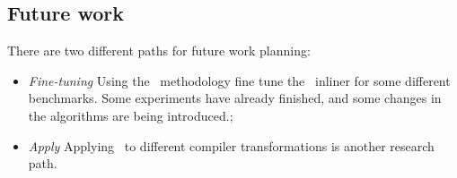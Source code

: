 \subsection{Future work}

There are two different paths for future work planning:
\begin{itemize}
\item {\it Fine-tuning} Using the \CP\ methodology fine tune the \FDI\ inliner for some different benchmarks. Some experiments have already finished, and some changes in the algorithms are being introduced.;

\item {\it Apply \CP}  Applying \CP\ to different compiler transformations is another research path.

\end{itemize}
